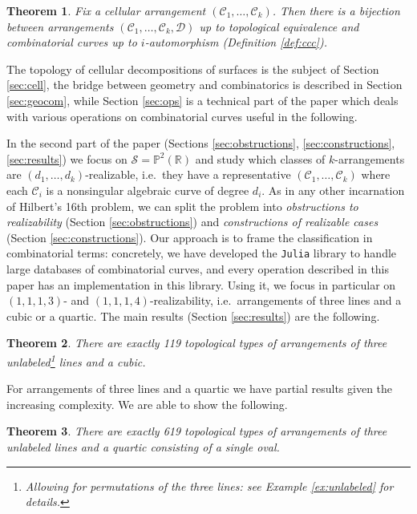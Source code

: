 \documentclass[11pt,reqno]{amsart}
\theoremstyle{plain}
\newtheorem{mainthm}{Theorem}
\theoremstyle{definition}
\theoremstyle{remark}
\numberwithin{equation}{subsection}
\newcommand*{\bbP}{\mathbb{P}}
\newcommand*{\bbR}{\mathbb{R}}
\newcommand*{\calC}{\mathcal{C}}
\newcommand*{\calD}{\mathcal{D}}
\newcommand*{\calS}{\mathcal{S}}
\begin{document}
\begin{mainthm}\label{thm:mainA}
    Fix a cellular arrangement $(\calC_1,\dots,\calC_k)$. Then there is a bijection between arrangements $(\calC_1,\dots,\calC_k,\calD)$ up to topological equivalence and combinatorial curves up to $i$-automorphism (Definition \ref{def:ccc}).
\end{mainthm}

The topology of cellular decompositions of surfaces is the subject of Section \ref{sec:cell}, the bridge between geometry and combinatorics is described in Section \ref{sec:geocom}, while Section \ref{sec:ops} is a technical part of the paper which deals with various operations on combinatorial curves useful in the following.

In the second part of the paper (Sections \ref{sec:obstructions}, \ref{sec:constructions}, \ref{sec:results}) we focus on $\calS=\bbP^2(\bbR)$ and study which classes of $k$-arrangements are $(d_1,\dots,d_k)$-realizable, i.e.\ they have a representative $(\calC_1,\dots,\calC_k)$ where each $\calC_i$ is a nonsingular algebraic curve of degree $d_i$. As in any other incarnation of Hilbert's 16th problem, we can split the problem into \textit{obstructions to realizability} (Section \ref{sec:obstructions}) and \textit{constructions of realizable cases} (Section \ref{sec:constructions}). Our approach is to frame the classification in combinatorial terms: concretely, we have developed the \texttt{Julia} \cite{Julia} library  \cite{NWTrepo} to handle large databases of combinatorial curves, and every operation described in this paper has an implementation in this library. Using it, we focus in particular on $(1,1,1,3)$- and $(1,1,1,4)$-realizability, i.e.\ arrangements of three lines and a cubic or a quartic. The main results (Section \ref{sec:results}) are the following.

\begin{mainthm}\label{thm:mainB}
    There are exactly 119 topological types of arrangements of three unlabeled\footnote{Allowing for permutations of the three lines: see Example \ref{ex:unlabeled} for details.} lines and a cubic.
\end{mainthm}

For arrangements of three lines and a quartic we have partial results given the increasing complexity. We are able to show the following.

\begin{mainthm}\label{thm:mainC}
    There are exactly 619 topological types of arrangements of three unlabeled lines and a quartic consisting of a single oval.
\end{mainthm}
\end{document}
